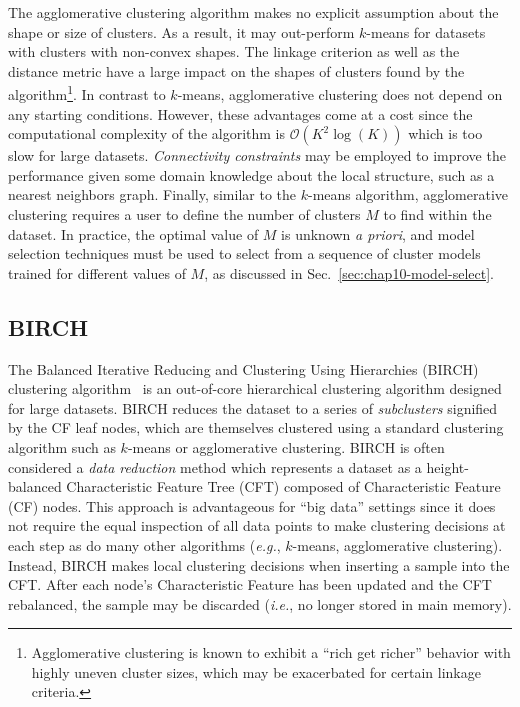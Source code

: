 The agglomerative clustering algorithm makes no explicit assumption about the shape or size of clusters. As a result, it may out-perform $k$-means for datasets with clusters with non-convex shapes. The linkage criterion as well as the distance metric have a large impact on the shapes of clusters found by the algorithm\footnote{Agglomerative clustering is known to exhibit a ``rich get richer'' behavior with highly uneven cluster sizes, which may be exacerbated for certain linkage criteria.}. In contrast to $k$-means, agglomerative clustering does not depend on any starting conditions. However, these advantages come at a cost since the computational complexity of the algorithm is $\mathcal{O}(K^{2}\log(K))$ which is too slow for large datasets. \textit{Connectivity constraints} may be employed to improve the performance given some domain knowledge about the local structure, such as a nearest neighbors graph. Finally, similar to the $k$-means algorithm, agglomerative clustering requires a user to define the number of clusters $M$ to find within the dataset. In practice, the optimal value of $M$ is unknown \textit{a priori}, and model selection techniques must be used to select from a sequence of cluster models trained for different values of $M$, as discussed in Sec.~\ref{sec:chap10-model-select}.

\subsection{BIRCH}
\label{subsec:chap10-birch}


The Balanced Iterative Reducing and Clustering Using Hierarchies (BIRCH) clustering algorithm~\cite{zhang1996birch} is an out-of-core hierarchical clustering algorithm designed for large datasets.
BIRCH reduces the dataset to a series of \textit{subclusters} signified by the CF leaf nodes, which are themselves clustered using a standard clustering algorithm such as $k$-means or agglomerative clustering.
BIRCH is often considered a \textit{data reduction} method which represents a dataset as a height-balanced Characteristic Feature Tree (CFT) composed of Characteristic Feature (CF) nodes. This approach is advantageous for ``big data'' settings since it does not require the equal inspection of all data points to make clustering decisions at each step as do many other algorithms (\textit{e.g.}, $k$-means, agglomerative clustering). Instead, BIRCH makes local clustering decisions when inserting a sample into the CFT. After each node's Characteristic Feature has been updated and the CFT rebalanced, the sample may be discarded (\textit{i.e.}, no longer stored in main memory). 

